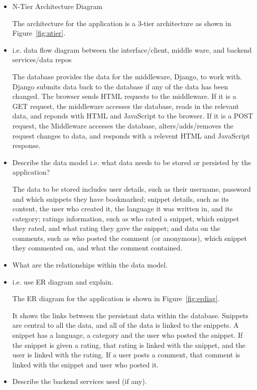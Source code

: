 \documentclass{sig-alt-release2}
\begin{document}
\begin{itemize}
\item	N-Tier Architecture Diagram

The architecture for the application is a 3-tier architecture as shown
in Figure~\ref{fig:ntier}.

\item	i.e. data flow diagram between the interface/client, middle ware,
and backend services/data repos

The database provides the data for the middleware, Django, to work with.
Django submits data back to the database if any of the data has been
changed. The browser sends HTML requests to the middleware. If it is
a GET request, the middleware accesses the database, reads in the relevant
data, and reponds with HTML and JavaScript to the browser. If it is a
POST request, the Middleware accesses the database, alters/adds/removes
the request changes to data, and responds with a relevent HTML and
JavaScript response.

\item	Describe the data model i.e. what data needs to be stored or
persisted by the application?

The data to be stored includes user details, such as their username,
password and which snippets they have bookmarked; snippet details, such
as its content, the user who created it, the language it was written in,
and its category; ratings information, such as who rated a snippet,
which snippet they rated, and what rating they gave the snippet; and
data on the comments, such as who posted the comment (or anonymous),
which snippet they commented on, and what the comment contained.

\item	What are the relationships within the data model.
\item	i.e. use ER diagram and explain.

The ER diagram for the application is shown in Figure~\ref{fig:erdiag}.

It shows the links between the persistant data within the database.
Snippets are central to all the data, and all of the data is linked
to the snippets. A snippet has a language, a category and the user
who posted the snippet. If the snippet is given a rating, that
rating is linked with the snippet, and the user is linked with the
rating. If a user posts a comment, that comment is linked with the
snippet and user who posted it.

\item	Describe the backend services used (if any).


\end{itemize}
\end{document}
